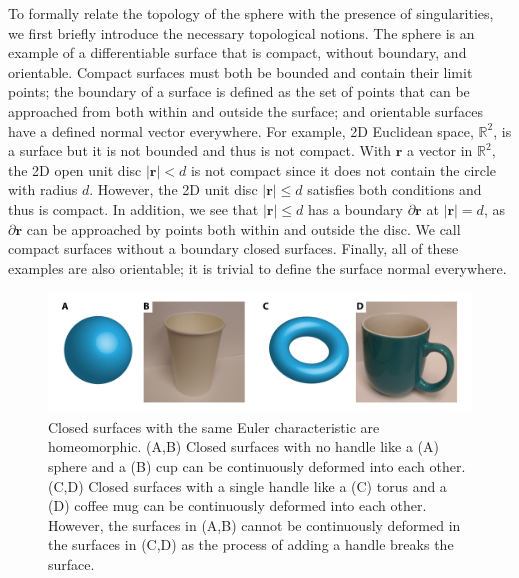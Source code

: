 To formally relate the topology of the sphere with the presence of singularities, we first briefly introduce the necessary topological notions.
The sphere is an example of a differentiable surface that is compact, without boundary, and orientable.
Compact surfaces must both be bounded and contain their limit points; the boundary of a surface is defined as the set of points that can be approached from both within and outside the surface; and orientable surfaces have a defined normal vector everywhere.
For example, 2D Euclidean space, $\mathbb{R}^2$, is a surface but it is not bounded and thus is not compact.
With $\mathbf{r}$ a vector in $\mathbb{R}^2$, the 2D open unit disc $|\mathbf{r}| < d$ is not compact since it does not contain the circle with radius $d$.
However, the 2D unit disc $|\mathbf{r}| \leq d$ satisfies both conditions and thus is compact.
In addition, we see that $|\mathbf{r}| \leq d$ has a boundary $\partial \mathbf{r}$ at $|\mathbf{r}| = d$, as $\partial \mathbf{r}$ can be approached by points both within and outside the disc.
We call compact surfaces without a boundary closed surfaces.
Finally, all of these examples are also orientable; it is trivial to define the surface normal everywhere.
\begin{figure}
  \centering
  \includegraphics{figures/C1/Ch1-Figs_ChiObjects.png}
  \caption{Closed surfaces with the same Euler characteristic are homeomorphic. (A,B) Closed surfaces with no handle like a (A) sphere and a (B) cup can be continuously deformed into each other.
  (C,D) Closed surfaces with a single handle like a (C) torus and a (D) coffee mug can be continuously deformed into each other.
  However, the surfaces in (A,B) cannot be continuously deformed in the surfaces in (C,D) as the process of adding a handle breaks the surface.}\label{f:1-ChiObjects}
\end{figure}

